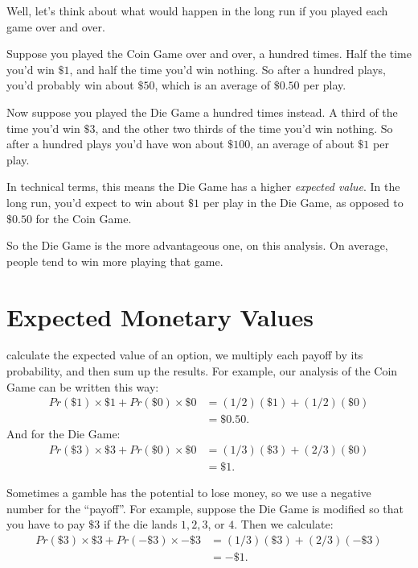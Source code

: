 \documentclass[justified]{tufte-book}
\newcommand{\p}{Pr}
\theoremstyle{definition}
\theoremstyle{definition}
\theoremstyle{definition}
\theoremstyle{remark}
\begin{document}
Well, let's think about what would happen in the long run if you played each game over and over.

Suppose you played the Coin Game over and over, a hundred times. Half the time you'd win \(\$1\), and half the time you'd win nothing. So after a hundred plays, you'd probably win about \(\$50\), which is an average of \(\$0.50\) per play.

Now suppose you played the Die Game a hundred times instead. A third of the time you'd win \(\$3\), and the other two thirds of the time you'd win nothing. So after a hundred plays you'd have won about \(\$100\), an average of about \(\$1\) per play.

In technical terms, this means the Die Game has a higher \emph{expected value}. In the long run, you'd expect to win about \(\$1\) per play in the Die Game, as opposed to \(\$0.50\) for the Coin Game.

So the Die Game is the more advantageous one, on this analysis. On average, people tend to win more playing that game.

\hypertarget{expected-monetary-values}{%
\section{Expected Monetary Values}\label{expected-monetary-values}}

 calculate the expected value of an option, we multiply each payoff by its probability, and then sum up the results. For example, our analysis of the Coin Game can be written this way:
\[
  \begin{aligned}
    \p(\$1) \times \$1 + \p(\$0) \times \$0 &= (1/2)(\$1) + (1/2)(\$0)\\
      &= \$0.50.
  \end{aligned}
\]
And for the Die Game:
\[
  \begin{aligned}
    \p(\$3) \times \$3 + \p(\$0) \times \$0 &= (1/3)(\$3) + (2/3)(\$0)\\
      &= \$1.
  \end{aligned}
\]

Sometimes a gamble has the potential to lose money, so we use a negative number for the ``payoff''. For example, suppose the Die Game is modified so that you have to pay \(\$3\) if the die lands \(1, 2, 3\), or \(4\). Then we calculate:
\[
  \begin{aligned}
    \p(\$3) \times \$3 + \p(-\$3) \times -\$3 &= (1/3)(\$3) + (2/3)(-\$3)\\
      &= -\$1.
  \end{aligned}
\]
\end{document}
